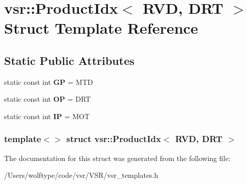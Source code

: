 \hypertarget{structvsr_1_1_product_idx_3_01_r_v_d_00_01_d_r_t_01_4}{\section{vsr\-:\-:Product\-Idx$<$ R\-V\-D, D\-R\-T $>$ Struct Template Reference}
\label{structvsr_1_1_product_idx_3_01_r_v_d_00_01_d_r_t_01_4}
}
\subsection*{Static Public Attributes}
\begin{DoxyCompactItemize}
\item 
\hypertarget{structvsr_1_1_product_idx_3_01_r_v_d_00_01_d_r_t_01_4_ab81574b9379f0033b443dd67565541e5}{static const int {\bfseries G\-P} = M\-T\-D}\label{structvsr_1_1_product_idx_3_01_r_v_d_00_01_d_r_t_01_4_ab81574b9379f0033b443dd67565541e5}

\item 
\hypertarget{structvsr_1_1_product_idx_3_01_r_v_d_00_01_d_r_t_01_4_a46a8bef09c2b55006b621f96072aaa07}{static const int {\bfseries O\-P} = D\-R\-T}\label{structvsr_1_1_product_idx_3_01_r_v_d_00_01_d_r_t_01_4_a46a8bef09c2b55006b621f96072aaa07}

\item 
\hypertarget{structvsr_1_1_product_idx_3_01_r_v_d_00_01_d_r_t_01_4_a77f59a125d5479bbcd5008c6f23aeb96}{static const int {\bfseries I\-P} = M\-O\-T}\label{structvsr_1_1_product_idx_3_01_r_v_d_00_01_d_r_t_01_4_a77f59a125d5479bbcd5008c6f23aeb96}

\end{DoxyCompactItemize}
\subsubsection*{template$<$$>$ struct vsr\-::\-Product\-Idx$<$ R\-V\-D, D\-R\-T $>$}



The documentation for this struct was generated from the following file\-:\begin{DoxyCompactItemize}
\item 
/\-Users/wolftype/code/vsr/\-V\-S\-R/vsr\-\_\-templates.\-h\end{DoxyCompactItemize}
